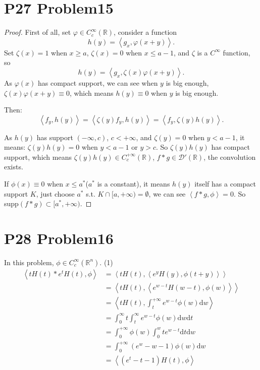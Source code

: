 \documentclass[a4paper]{ctexart}
\newcommand{\dif}{\mathrm{d}}
\newcommand{\innerprod}[2]{\left<#1,#2\right>}
\begin{document}
\section*{P27 Problem15}
\begin{proof}
    First of all, set $\varphi\in C_{c}^{\infty}(\mathbb{R})$, consider a function 
    \begin{equation}
        h(y)=\innerprod{g_{x}}{\varphi(x+y)}.
    \end{equation}
    Set $\zeta(x)=1$ when $x\ge a$, $\zeta(x)=0$ when $x\le a-1$, and $\zeta$ is a $C^{\infty}$ function, so 
    \begin{equation}
        h(y)=\innerprod{g_{x}}{\zeta(x)\varphi(x+y)}.
    \end{equation}
    As $\varphi(x)$ has compact support, we can see when $y$ is big enough, $\zeta(x)\varphi(x+y)\equiv 0$, which means $h(y)\equiv 0$ when $y$ is big enough.

    Then:
    \begin{equation}
        \innerprod{f_{y}}{h(y)}=\innerprod{\zeta(y)f_{y}}{h(y)}=\innerprod{f_{y}}{\zeta(y)h(y)}.
    \end{equation}

    As $h(y)$ has support $(-\infty,c)$, $c<+\infty$, and $\zeta(y)=0$ when $y<a-1$, it means:
    $\zeta(y)h(y)=0$ when $y<a-1$ or $y>c$. So $\zeta(y)h(y)$ has compact support, which means $\zeta(y)h(y)\in C_{c}^{+\infty}(\mathbb{R})$, $f*g\in\mathcal{D}'(\mathbb{R})$, the convolution exists.
    
    If $\phi(x)\equiv 0$ when $x\le a^{*}$($a^{*}$ is a constant), it means $h(y)$ itself has a compact support $K$, just choose $a^{*}$ s.t. $K\cap [a,+\infty)=\emptyset$, we can see $\innerprod{f*g}{\phi}=0$.  So supp$(f*g)\subset[a^{*},+\infty)$.
\end{proof}
\section*{P28 Problem16}
In this problem, $\phi\in C_{c}^{\infty}(\mathbb{R}^{n})$.
(1)
\begin{equation}
    \begin{aligned}
        \innerprod{tH(t)*e^{t}H(t)}{\phi}&=\innerprod{tH(t)}{\innerprod{e^{y}H(y)}{\phi(t+y)}}\\
        &=\innerprod{tH(t)}{\innerprod{e^{w-t}H(w-t)}{\phi(w)}}\\
        &=\innerprod{tH(t)}{\int_{t}^{+\infty}e^{w-t}\phi(w)\dif w}\\
        &=\int_{0}^{\infty}t\int_{t}^{\infty}e^{w-t}\phi(w)\dif w\dif t\\
        &=\int_{0}^{+\infty}\phi(w)\int_{0}^{w}te^{w-t}\dif t\dif w\\
        &=\int_{0}^{+\infty}(e^{w}-w-1)\phi(w)\dif w\\
        &=\innerprod{(e^{t}-t-1)H(t)}{\phi}\\
    \end{aligned}
\end{equation}
\end{document}
